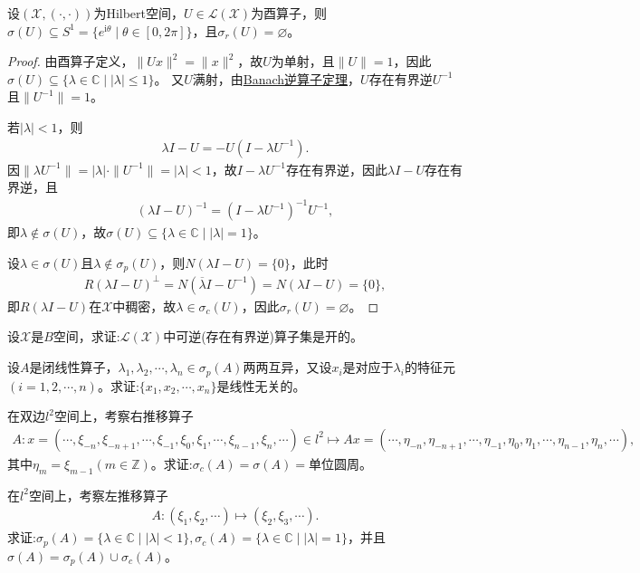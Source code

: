 \documentclass[../../main.tex]{subfiles}%
\begin{document}
\begin{proposition}
设$(\mathscr{X},(\cdot,\cdot))$为Hilbert空间，$U\in\mathscr{L}(\mathscr{X})$为酉算子，则$\sigma(U)\subseteq S^1=\{e^{\mathrm{i}\theta }\mid\theta\in[0,2\pi]\}$，且$\sigma_r(U)=\varnothing $。
\end{proposition}
\begin{proof}
由酉算子定义，$\|Ux\|^2=\|x\|^2$，故$U$为单射，且$\|U\|=1$，因此$\sigma(U)\subseteq\{\lambda\in\mathbb{C}\mid|\lambda|\leqslant1\}$。
又$U$满射，由\hyperref[theorem:泛函分析--Banach逆算子定理]{Banach逆算子定理}，$U$存在有界逆$U^{-1}$且$\|U^{-1}\|=1$。

若$|\lambda|<1$，则
\begin{align}
\lambda I-U=-U(I-\lambda U^{-1}).
\label{eq:unitary-decomp}
\end{align}
因$\|\lambda U^{-1}\|=|\lambda|\cdot\|U^{-1}\|=|\lambda|<1$，故$I-\lambda U^{-1}$存在有界逆，因此$\lambda I-U$存在有界逆，且
\begin{align*}
(\lambda I-U)^{-1}=(I-\lambda U^{-1})^{-1}U^{-1},
\end{align*}
即$\lambda\notin\sigma(U)$，故$\sigma(U)\subseteq\{\lambda\in\mathbb{C}\mid|\lambda|=1\}$。

设$\lambda\in\sigma(U)$且$\lambda\notin\sigma_p(U)$，则$N(\lambda I-U)=\{0\}$，此时
\begin{align*}
R(\lambda I-U)^{\perp}=N(\overline{\lambda}I-U^{-1})=N(\lambda I-U)=\{0\},
\end{align*}
即$R(\lambda I-U)$在$\mathscr{X}$中稠密，故$\lambda\in\sigma_c(U)$，因此$\sigma_r(U)=\varnothing $。
\end{proof}



\begin{example}
设$\mathscr{X}$是$B$空间，求证:$\mathscr{L}(\mathscr{X})$中可逆(存在有界逆)算子集是开的。
\end{example}

\begin{example}
设$A$是闭线性算子，$\lambda_1,\lambda_2,\cdots,\lambda_n\in\sigma_p(A)$两两互异，又设$x_i$是对应于$\lambda_i$的特征元$(i=1,2,\cdots,n)$。求证:$\{x_1,x_2,\cdots,x_n\}$是线性无关的。
\end{example}

\begin{example}
在双边$l^2$空间上，考察右推移算子
\begin{align*}
A:x=(\cdots,\xi_{-n},\xi_{-n+1},\cdots,\xi_{-1},\xi_0,\xi_1,\cdots,\xi_{n-1},\xi_n,\cdots)\in l^2
\mapsto Ax=(\cdots,\eta_{-n},\eta_{-n+1},\cdots,\eta_{-1},\eta_0,\eta_1,\cdots,\eta_{n-1},\eta_n,\cdots),
\end{align*}
其中$\eta_m=\xi_{m-1}(m\in\mathbb{Z})$。求证:$\sigma_c(A)=\sigma(A)=$单位圆周。
\end{example}

\begin{example}
在$l^2$空间上，考察左推移算子
\begin{align*}
A:(\xi_1,\xi_2,\cdots)\mapsto(\xi_2,\xi_3,\cdots).
\end{align*}
求证:$\sigma_p(A)=\{\lambda\in\mathbb{C}\mid|\lambda|<1\},\sigma_c(A)=\{\lambda\in\mathbb{C}\mid|\lambda|=1\}$，并且$\sigma(A)=\sigma_p(A)\cup\sigma_c(A)$。
\end{example}
\end{document}
